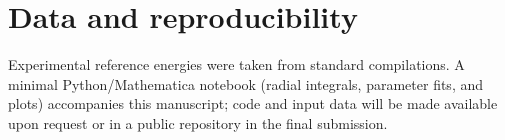 \documentclass[12pt]{article}
\begin{document}
\section*{Data and reproducibility}
Experimental reference energies were taken from standard compilations.\cite{NISTXray,Chantler} A minimal Python/Mathematica notebook (radial integrals, parameter fits, and plots) accompanies this manuscript; code and input data will be made available upon request or in a public repository in the final submission.

\cite{BetheSalpeter}       %
\cite{Grant}               %
\cite{Slater}              %
\cite{KrauseOliver}        %
\cite{Chantler}            %
\cite{NISTXray}            %
\cite{NeonPhotoionization} %
\end{document}
